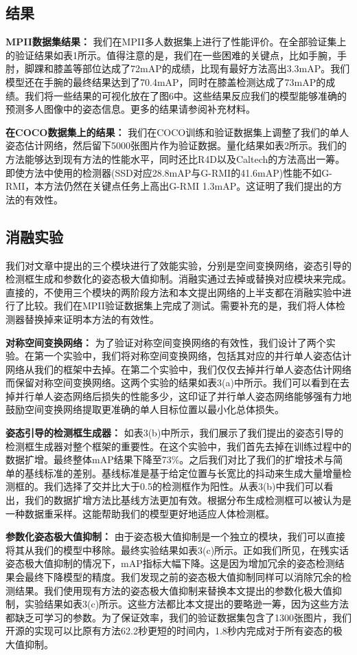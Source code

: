 \subsection*{结果}
\textbf{MPII数据集结果：} 我们在MPII多人数据集上进行了性能评价。在全部验证集上的验证结果如表1所示。值得注意的是，我们在一些困难的关键点，比如手腕，手肘，脚踝和膝盖等部位达成了72mAP的成绩，比现有最好方法高出3.3mAP。我们模型还在手腕的最终结果达到了70.4mAP，同时在膝盖检测达成了73mAP的成绩。我们将一些结果的可视化放在了图6中。这些结果反应我们的模型能够准确的预测多人图像中的姿态信息。更多的结果请参阅补充材料。

\textbf{在COCO数据集上的结果：} 我们在COCO训练和验证数据集上调整了我们的单人姿态估计网络，然后留下5000张图片作为验证数据。量化结果如表2所示。我们的方法能够达到现有方法的性能水平，同时还比R4D以及Caltech的方法高出一筹。即使方法中使用的检测器(SSD对应28.8mAP与G-RMI的41.6mAP)性能不如G-RMI，本方法仍然在关键点任务上高出G-RMI 1.3mAP。这证明了我们提出的方法的有效性。

\subsection*{消融实验}
我们对文章中提出的三个模块进行了效能实验，分别是空间变换网络，姿态引导的检测框生成和参数化的姿态极大值抑制。消融实通过去掉或替换对应模块来完成。直接的，不使用三个模块的两阶段方法和本文提出网络的上半支都在消融实验中进行了比较。我们在MPII验证数据集上完成了测试。需要补充的是，我们将人体检测器替换掉来证明本方法的有效性。

\textbf{对称空间变换网络：} 为了验证对称空间变换网络的有效性，我们设计了两个实验。在第一个实验中，我们将对称空间变换网络，包括其对应的并行单人姿态估计网络从我们的框架中去掉。在第二个实验中，我们仅仅去掉并行单人姿态估计网络而保留对称空间变换网络。这两个实验的结果如表3(a)中所示。我们可以看到在去掉并行单人姿态网络后损失的性能多少，这印证了并行单人姿态网络能够强有力地鼓励空间变换网络提取更准确的单人目标位置以最小化总体损失。

\textbf{姿态引导的检测框生成器：} 如表3(b)中所示，我们展示了我们提出的姿态引导的检测框生成器对整个框架的重要性。在这个实验中，我们首先去掉在训练过程中的数据扩增。最终整体mAP结果下降至73\%。之后我们对比了我们的扩增技术与简单的基线标准的差别。基线标准是基于给定位置与长宽比的抖动来生成大量增量检测框的。我们选择了交并比大于0.5的检测框作为阳性。从表3(b)中我们可以看出，我们的数据扩增方法比基线方法更加有效。根据分布生成检测框可以被认为是一种数据重采样。这能帮助我们的模型更好地适应人体检测框。

\textbf{参数化姿态极大值抑制：} 由于姿态极大值抑制是一个独立的模块，我们可以直接将其从我们的模型中移除。最终实验结果如表3(c)所示。正如我们所见，在残实话姿态极大值抑制的情况下，mAP指标大幅下降。这是因为增加冗余的姿态检测结果会最终下降模型的精度。我们发现之前的姿态极大值抑制同样可以消除冗余的检测结果。我们使用现有方法的姿态极大值抑制来替换本文提出的参数化极大值抑制，实验结果如表3(c)所示。这些方法都比本文提出的要略逊一筹，因为这些方法都缺乏可学习的参数。为了保证效率，我们的验证数据集包含了1300张图片，我们开源的实现可以比原有方法62.2秒更短的时间内，1.8秒内完成对于所有姿态的极大值抑制。

